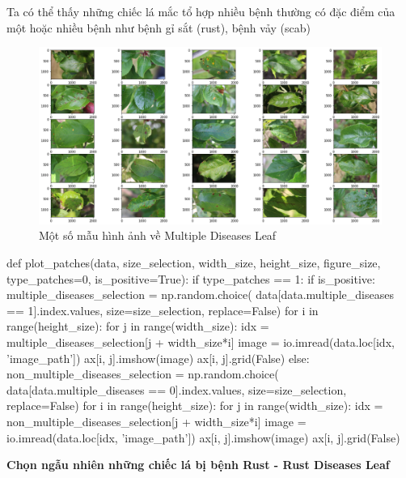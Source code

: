 \documentclass{article}
\begin{document}
	Ta có thể thấy những chiếc lá mắc tổ hợp nhiều bệnh thường có đặc điểm của một hoặc nhiều bệnh như bệnh gỉ sắt (rust), bệnh vảy (scab)
	\begin{figure}[H]
		\centering
		\includegraphics[width=1\linewidth]{images/sample_multiple_diseases_leaf.png}
		\caption{Một số mẫu hình ảnh về Multiple Diseases Leaf}
		\label{fig:writing-thesis}
	\end{figure}
	\begin{python}
		def plot_patches(data, size_selection, width_size, height_size, figure_size, type_patches=0, is_positive=True):
			if type_patches == 1:
				if is_positive:
				multiple_diseases_selection = np.random.choice(
				data[data.multiple_diseases == 1].index.values, size=size_selection, replace=False)
				for i in range(height_size):
					for j in range(width_size):
						idx = multiple_diseases_selection[j + width_size*i]
						image = io.imread(data.loc[idx, 'image_path'])
						ax[i, j].imshow(image)
						ax[i, j].grid(False)
				else:
					non_multiple_diseases_selection = np.random.choice(
					data[data.multiple_diseases == 0].index.values, size=size_selection, replace=False)
					for i in range(height_size):
						for j in range(width_size):
							idx = non_multiple_diseases_selection[j + width_size*i]
							image = io.imread(data.loc[idx, 'image_path'])
							ax[i, j].imshow(image)
							ax[i, j].grid(False)
	\end{python}
	\textbf{Chọn ngẫu nhiên những chiếc lá bị bệnh Rust - Rust Diseases Leaf}
	
\end{document}

